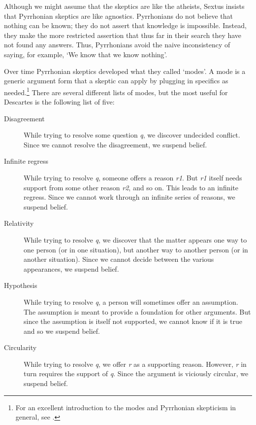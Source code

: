 Although we might assume that the skeptics are like the atheists, Sextus insists that Pyrrhonian skeptics are like agnostics. Pyrrhonians do not believe that nothing can be known; they do not assert that knowledge is impossible. Instead, they make the more restricted assertion that thus far in their search they have not found any answers. Thus, Pyrrhonians avoid the naive inconsistency of saying, for example, `We know that we know nothing'.

Over time Pyrrhonian skeptics developed what they called `modes'. A mode is a generic argument form that a skeptic can apply by plugging in specifics as needed.\footnote{For an excellent introduction to the modes and Pyrrhonian skepticism in general, see \cite{annasbarnes1994}.} There are several different lists of modes, but the most useful for Descartes is the following list of five:

\begin{description}
    \item[Disagreement] While trying to resolve some question \textit{q}, we discover undecided conflict. Since we cannot resolve the disagreement, we suspend belief.
    \item[Infinite regress] While trying to resolve \textit{q}, someone offers a reason \textit{r1}. But \textit{r1} itself needs support from some other reason \textit{r2}, and so on. This leads to an infinite regress. Since we cannot work through an infinite series of reasons, we suspend belief.
    \item[Relativity] While trying to resolve \textit{q}, we discover that the matter appears one way to one person (or in one situation), but another way to another person (or in another situation). Since we cannot decide between the various appearances, we suspend belief.
    \item[Hypothesis] While trying to resolve \textit{q}, a person will sometimes offer an assumption. The assumption is meant to provide a foundation for other arguments. But since the assumption is itself not supported, we cannot know if it is true and so we suspend belief.
    \item[Circularity] While trying to resolve \textit{q}, we offer \textit{r} as a supporting reason. However, \textit{r} in turn requires the support of \textit{q}. Since the argument is viciously circular, we suspend belief.
\end{description}

